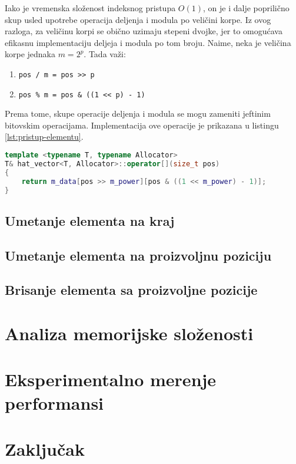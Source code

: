 \documentclass[a4paper]{article}
\begin{document}
Iako je vremenska složenost indeksnog pristupa $O(1)$, on je i dalje poprilično skup usled upotrebe operacija deljenja i modula po veličini korpe. Iz ovog razloga, za veličinu korpi se obično uzimaju stepeni dvojke, jer to omogućava efikasnu implementaciju deljeja i modula po tom broju. Naime, neka je veličina korpe jednaka $m = 2^p$. Tada važi:
\begin{enumerate}
    \item \verb|pos / m = pos >> p|
    \item \verb|pos % m = pos & ((1 << p) - 1)|
\end{enumerate}
Prema tome, skupe operacije deljenja i modula se mogu zameniti jeftinim bitovskim operacijama. Implementacija ove operacije je prikazana u listingu \ref{lst:pristup-elementu}.

\begin{lstlisting}[language=C++, caption={Operacija pristupa elementu po indeksu \textit{pos}}, captionpos=b, label={lst:pristup-elementu}]
template <typename T, typename Allocator>
T& hat_vector<T, Allocator>::operator[](size_t pos)
{
    return m_data[pos >> m_power][pos & ((1 << m_power) - 1)];
}
\end{lstlisting}

\subsection{Umetanje elementa na kraj}

\subsection{Umetanje elementa na proizvoljnu poziciju}

\subsection{Brisanje elementa sa proizvoljne pozicije}

\section{Analiza memorijske složenosti}

\section{Eksperimentalno merenje performansi}

\section{Zaključak}

\appendix


\end{document}
